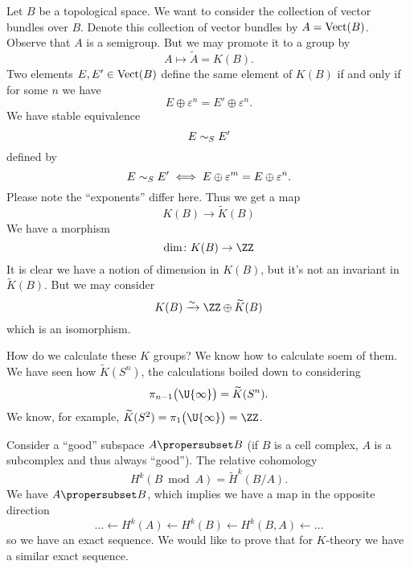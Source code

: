 Let $B$ be a topological space. We want to consider the
collection of vector bundles over $B$. Denote this collection of
vector bundles by $A=\mathop{\mathrm{Vect}}\nolimits(B)$. Observe that $A$ is a semigroup.
But we may promote it to a group by
\begin{equation}
A\mapsto\widetilde{A}=K(B).
\end{equation}
Two elements $E,E'\in\mathop{\mathrm{Vect}}\nolimits(B)$ define the same element of $K(B)$
if and only if for some $n$ we have
\begin{equation}
E\oplus\varepsilon^n=E'\oplus\varepsilon^n.
\end{equation}
We have stable equivalence
\begin{equation}
E\sim_{S} E'
\end{equation}
defined by
\begin{equation}
E\sim_{S} E' \iff E\oplus\varepsilon^m=E\oplus\varepsilon^n.
\end{equation}
Please note the ``exponents'' differ here. Thus we get a map
\begin{equation}
K(B)\to\widetilde{K}(B)
\end{equation}
We have a morphism
\begin{equation}
\dim\colon K(B)\to\ZZ
\end{equation}
It is clear we have a notion of dimension in $K(B)$, but it's
not an invariant in $\widetilde{K}(B)$. But we may consider
\begin{equation}
K(B)\xrightarrow{\sim}\ZZ\oplus\widetilde{K}(B)
\end{equation}
which is an isomorphism.

How do we calculate these $K$ groups? We know how to calculate
soem of them. We have seen how $\widetilde{K}(S^{n})$, the
calculations boiled down to considering
\begin{equation}
\pi_{n-1}\bigl(\U{\infty}\bigr)=\widetilde{K}(S^{n}).
\end{equation}
We know, for example,
$\widetilde{K}(S^{2})=\pi_{1}\bigl(\U{\infty}\bigr)=\ZZ$.

Consider a ``good'' subspace $A\propersubset B$ (if $B$ is a cell
complex, $A$ is a subcomplex and thus always ``good''). The
relative cohomology
\begin{equation}
H^{k}(B\bmod A)=\widetilde{H}^{k}(B/A).
\end{equation}
We have $A\propersubset B$, which implies we have a map in the
opposite direction
\begin{equation}
\dots\gets H^{k}(A)\gets H^{k}(B)\gets H^{k}(B,A)\gets\dots
\end{equation}
so we have an exact sequence. We would like to prove that for
$K$-theory we have a similar exact sequence.

